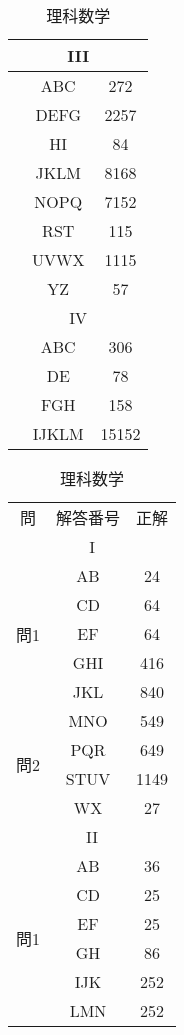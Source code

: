 \documentclass{jsarticle}
\begin{document}
\begin{CJK}{UTF8}{min}
\begin{table}[htbp]
\begin{minipage}[t]{0.48\textwidth}
\begin{tabular}{|c|c|c|}
\hline
\multicolumn{3}{|c|}{III} \\
\hline
 & \textsf{ABC} & 272 \\
 & \textsf{DEFG} & 2257 \\
 & \textsf{HI} & 84 \\
 & \textsf{JKLM} & 8168 \\
 & \textsf{NOPQ} & 7152 \\
 & \textsf{RST} & 115 \\
 & \textsf{UVWX} & 1115 \\
 & \textsf{YZ} & 57 \\
\hline
\multicolumn{3}{|c|}{IV} \\
\hline
 & \textsf{ABC} & 306\\
 & \textsf{DE} & 78 \\
 & \textsf{FGH} & 158 \\
 & \textsf{IJKLM} & 15152\\
\hline
\end{tabular}
\end{minipage}
\hfill
\begin{minipage}[t]{0.48\textwidth}
\centering
\caption*{理科数学}
\begin{tabular}{|c|c|c|}
\hline
\multirow{2}{*}{問} & \multirow{2}{*}{解答番号} & \multirow{2}{*}{正解} \\
 &  & \\
\hline
\multicolumn{3}{|c|}{I} \\
\hline
\multirow{5}{*}{問1} 
 & \textsf{AB} & 24 \\
 & \textsf{CD} & 64 \\
 & \textsf{EF} & 64 \\
 & \textsf{GHI} & 416 \\
 & \textsf{JKL} & 840 \\
\hline
\multirow{4}{*}{問2} 
 & \textsf{MNO} & 549 \\
 & \textsf{PQR} & 649 \\
 & \textsf{STUV} & 1149\\
 & \textsf{WX} & 27 \\
\hline
\multicolumn{3}{|c|}{II} \\
\hline
\multirow{6}{*}{問1} 
 & \textsf{AB} & 36 \\
 & \textsf{CD} & 25 \\
 & \textsf{EF} & 25 \\
 & \textsf{GH} & 86 \\
 & \textsf{IJK} & 252 \\
 & \textsf{LMN} & 252 \\

\end{tabular}
\end{minipage}
\end{table}
\end{CJK}
\end{document}
